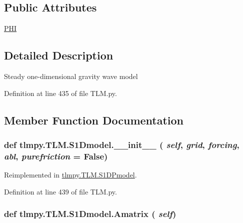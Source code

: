 \subsection*{Public Attributes}
\begin{DoxyCompactItemize}
\item 
\hyperlink{classtlmpy_1_1TLM_1_1S1Dmodel_a4ca827e20646abc581024cb3d9db8721}{PHI}
\end{DoxyCompactItemize}


\subsection{Detailed Description}
\begin{DoxyVerb}
Steady one-dimensional gravity wave model
\end{DoxyVerb}
 

Definition at line 435 of file TLM.py.

\subsection{Member Function Documentation}
\hypertarget{classtlmpy_1_1TLM_1_1S1Dmodel_afa7ad638bff97e50b1a58d9d30472eaf}{
\subsubsection[{\_\-\_\-init\_\-\_\-}]{\setlength{\rightskip}{0pt plus 5cm}def tlmpy.TLM.S1Dmodel.\_\-\_\-init\_\-\_\- ( {\em self}, \/   {\em grid}, \/   {\em forcing}, \/   {\em abl}, \/   {\em purefriction} = {\ttfamily False})}}
\label{classtlmpy_1_1TLM_1_1S1Dmodel_afa7ad638bff97e50b1a58d9d30472eaf}


Reimplemented in \hyperlink{classtlmpy_1_1TLM_1_1S1DPmodel_ab3498d7f4c2f13b9ca65d1b5b327d549}{tlmpy.TLM.S1DPmodel}.

Definition at line 439 of file TLM.py.\hypertarget{classtlmpy_1_1TLM_1_1S1Dmodel_a5549b0af168b78c3d10c49056a65723a}{
\subsubsection[{Amatrix}]{\setlength{\rightskip}{0pt plus 5cm}def tlmpy.TLM.S1Dmodel.Amatrix ( {\em self})}}
\label{classtlmpy_1_1TLM_1_1S1Dmodel_a5549b0af168b78c3d10c49056a65723a}


